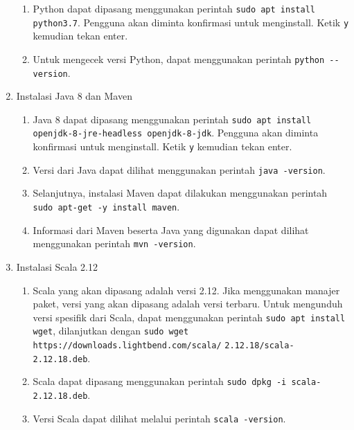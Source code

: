 \begin{enumerate}
  \begin{enumerate}
    \item Python dapat dipasang menggunakan perintah \verb|sudo apt install python3.7|. Pengguna akan diminta konfirmasi untuk menginstall. Ketik \verb|y| kemudian tekan enter.
    \item Untuk mengecek versi Python, dapat menggunakan perintah \verb|python --version|.
  \end{enumerate}
  \item Instalasi Java 8 dan Maven
  \begin{enumerate}
    \item Java 8 dapat dipasang menggunakan perintah \verb|sudo apt install openjdk-8-jre-headless openjdk-8-jdk|. Pengguna akan diminta konfirmasi untuk menginstall. Ketik \verb|y| kemudian tekan enter.
    \item Versi dari Java dapat dilihat menggunakan perintah \verb|java -version|.
    \item Selanjutnya, instalasi Maven dapat dilakukan menggunakan perintah \verb| sudo apt-get -y install maven|.
    \item Informasi dari Maven beserta Java yang digunakan dapat dilihat menggunakan perintah \verb|mvn -version|.
  \end{enumerate}
  \item Instalasi Scala 2.12
  \begin{enumerate}
    \item Scala yang akan dipasang adalah versi 2.12. Jika menggunakan manajer paket, versi yang akan dipasang adalah versi terbaru. Untuk mengunduh versi spesifik dari Scala, dapat menggunakan perintah \verb|sudo apt install wget|, dilanjutkan dengan \verb|sudo wget  https://downloads.lightbend.com/scala/| \verb|2.12.18/scala-2.12.18.deb|.
    \item Scala dapat dipasang menggunakan perintah \verb|sudo dpkg -i scala-2.12.18.deb|.
    \item Versi Scala dapat dilihat melalui perintah \verb|scala -version|.
  \end{enumerate}
\end{enumerate}